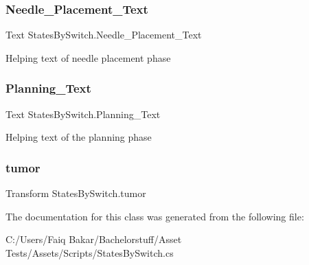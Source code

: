 \mbox{\label{class_states_by_switch_a36ebc107be9b12cb8a97bf1460423000}} 
\subsubsection{\texorpdfstring{Needle\+\_\+\+Placement\+\_\+\+Text}{Needle\_Placement\_Text}}
{\footnotesize\ttfamily Text States\+By\+Switch.\+Needle\+\_\+\+Placement\+\_\+\+Text}



Helping text of needle placement phase 

\mbox{\label{class_states_by_switch_ac7c8a7d50ecf021994bc930d51cbccb2}} 
\subsubsection{\texorpdfstring{Planning\+\_\+\+Text}{Planning\_Text}}
{\footnotesize\ttfamily Text States\+By\+Switch.\+Planning\+\_\+\+Text}



Helping text of the planning phase 

\mbox{\label{class_states_by_switch_a22ee2b11d00f659a78da32cec049de22}} 
\subsubsection{\texorpdfstring{tumor}{tumor}}
{\footnotesize\ttfamily Transform States\+By\+Switch.\+tumor}







The documentation for this class was generated from the following file\+:\begin{DoxyCompactItemize}
\item 
C\+:/\+Users/\+Faiq Bakar/\+Bachelorstuff/\+Asset Tests/\+Assets/\+Scripts/States\+By\+Switch.\+cs\end{DoxyCompactItemize}
